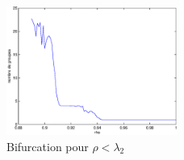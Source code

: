 \documentclass[12pt]{article}
\begin{document}
\begin{figure}[htb]
	\begin{center}
		\includegraphics[width=0.5\textwidth]{bifur}
		\caption{Bifurcation pour $\rho < \lambda_2$}
		\label{bifu_map}
	\end{center}
\end{figure}
\end{document}
